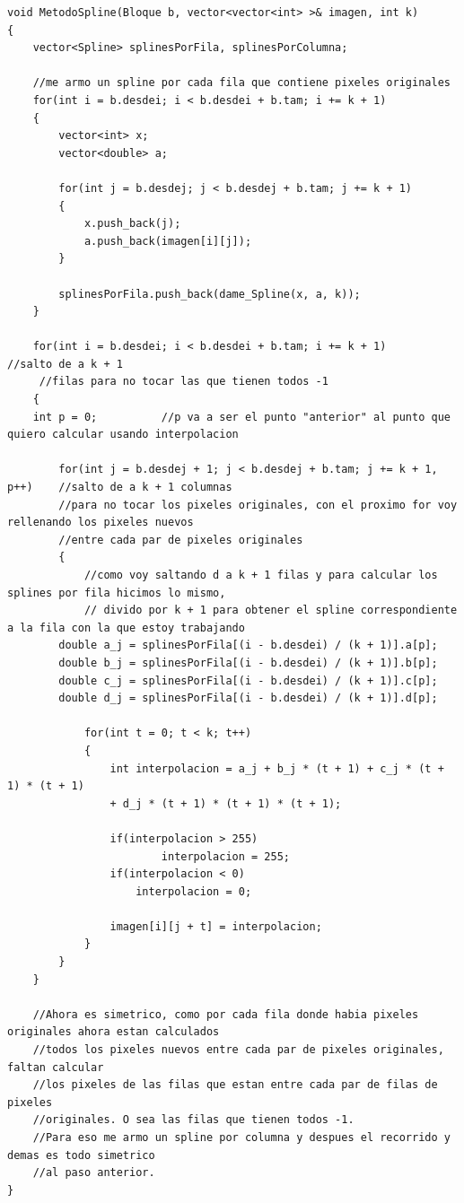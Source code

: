 \documentclass[a4paper]{article}
\newcounter{col}
\begin{document}
\begin{verbatim}
void MetodoSpline(Bloque b, vector<vector<int> >& imagen, int k)
{
	vector<Spline> splinesPorFila, splinesPorColumna;

	//me armo un spline por cada fila que contiene pixeles originales 
    for(int i = b.desdei; i < b.desdei + b.tam; i += k + 1)
    {
    	vector<int> x;
    	vector<double> a;

    	for(int j = b.desdej; j < b.desdej + b.tam; j += k + 1)
    	{
    	    x.push_back(j);
    	    a.push_back(imagen[i][j]);
    	}
 
    	splinesPorFila.push_back(dame_Spline(x, a, k));
    }

    for(int i = b.desdei; i < b.desdei + b.tam; i += k + 1)		//salto de a k + 1
     //filas para no tocar las que tienen todos -1
    {
    int p = 0;			//p va a ser el punto "anterior" al punto que quiero calcular usando interpolacion

    	for(int j = b.desdej + 1; j < b.desdej + b.tam; j += k + 1, p++)	//salto de a k + 1 columnas 
    	//para no tocar los pixeles originales, con el proximo for voy rellenando los pixeles nuevos 
    	//entre cada par de pixeles originales
    	{
    		//como voy saltando d a k + 1 filas y para calcular los splines por fila hicimos lo mismo,
    		// divido por k + 1 para obtener el spline correspondiente a la fila con la que estoy trabajando
        double a_j = splinesPorFila[(i - b.desdei) / (k + 1)].a[p];
        double b_j = splinesPorFila[(i - b.desdei) / (k + 1)].b[p];
        double c_j = splinesPorFila[(i - b.desdei) / (k + 1)].c[p];
        double d_j = splinesPorFila[(i - b.desdei) / (k + 1)].d[p];

    		for(int t = 0; t < k; t++)
    		{
    		    int interpolacion = a_j + b_j * (t + 1) + c_j * (t + 1) * (t + 1) 
    		    + d_j * (t + 1) * (t + 1) * (t + 1);

	    	    if(interpolacion > 255)
	    		        interpolacion = 255;
	    	    if(interpolacion < 0)
	  		        interpolacion = 0;

	    	    imagen[i][j + t] = interpolacion;
    		}
    	}
    }

    //Ahora es simetrico, como por cada fila donde habia pixeles originales ahora estan calculados 
    //todos los pixeles nuevos entre cada par de pixeles originales, faltan calcular
    //los pixeles de las filas que estan entre cada par de filas de pixeles 	                	
    //originales. O sea las filas que tienen todos -1.
    //Para eso me armo un spline por columna y despues el recorrido y demas es todo simetrico 
    //al paso anterior.
}   
   

\end{verbatim}
\end{document}
